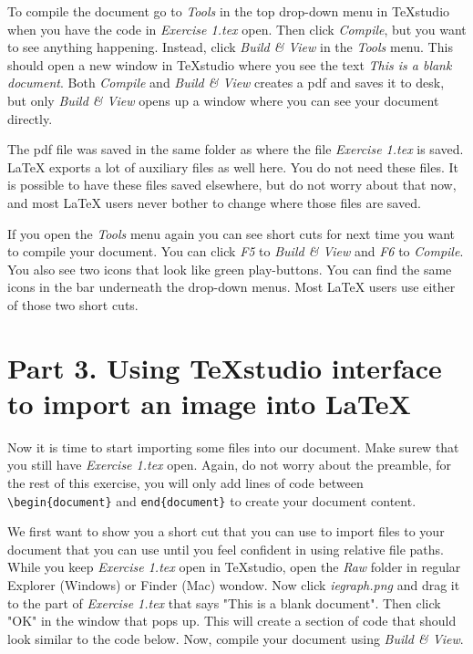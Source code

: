 \documentclass[12pts]{report}
\begin{document}
To compile the document go to \emph{Tools} in the top drop-down menu in TeXstudio when you have the code in \emph{Exercise 1.tex} open. Then click \emph{Compile}, but you want to see anything happening. Instead, click \emph{Build \& View} in the \emph{Tools} menu. This should open a new window in TeXstudio where you see the text \emph{This is a blank document}. Both \emph{Compile} and \emph{Build \& View} creates a pdf and saves it to desk, but only \emph{Build \& View} opens up a window where you can see your document directly. 

The pdf file was saved in the same folder as where the file \emph{Exercise 1.tex} is saved. {\LaTeX} exports a lot of auxiliary files as well here. You do not need these files. It is possible to have these files saved elsewhere, but do not worry about that now, and most {\LaTeX} users never bother to change where those files are saved.

If you open the \emph{Tools} menu again you can see short cuts for next time you want to compile your document. You can click \emph{F5} to \emph{Build \& View} and \emph{F6} to \emph{Compile}. You also see two icons that look like green play-buttons. You can find the same icons in the bar underneath the drop-down menus. Most {\LaTeX} users use either of those two short cuts.

\section*{Part 3. Using TeXstudio interface to import an image into \LaTeX}
Now it is time to start importing some files into our document. Make surew that you still have \emph{Exercise 1.tex} open. Again, do not worry about the preamble, for the rest of this exercise, you will only add lines of code between \verb|\begin{document}| and \verb|end{document}| to create your document content.

We first want to show you a short cut that you can use to import files to your document that you can use until you feel confident in using relative file paths. While you keep \emph{Exercise 1.tex} open in TeXstudio, open the \emph{Raw} folder in regular Explorer (Windows) or Finder (Mac) wondow. Now click \emph{iegraph.png} and drag it to the part of \emph{Exercise 1.tex} that says "This is a blank document". Then click "OK" in the window that pops up. This will create a section of code that should look similar to the code below. Now, compile your document using \emph{Build \& View}.
\end{document}
